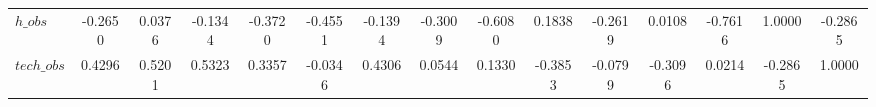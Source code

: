 \begin{center}
\begin{longtable}{lcccccccccccccc}
$h\_obs         $	 & 	          -0.2650	 & 	           0.0376	 & 	          -0.1344	 & 	          -0.3720	 & 	          -0.4551	 & 	          -0.1394	 & 	          -0.3009	 & 	          -0.6080	 & 	           0.1838	 & 	          -0.2619	 & 	           0.0108	 & 	          -0.7616	 & 	           1.0000	 & 	          -0.2865 \\ 
$tech\_obs      $	 & 	           0.4296	 & 	           0.5201	 & 	           0.5323	 & 	           0.3357	 & 	          -0.0346	 & 	           0.4306	 & 	           0.0544	 & 	           0.1330	 & 	          -0.3853	 & 	          -0.0799	 & 	          -0.3096	 & 	           0.0214	 & 	          -0.2865	 & 	           1.0000 \\ 
\end{longtable}
 \end{center}
